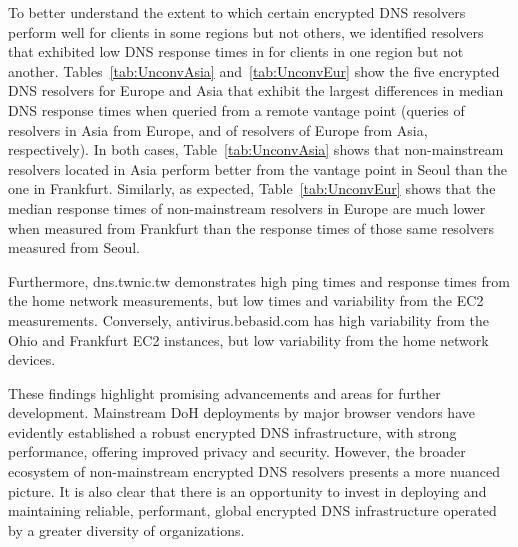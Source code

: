 To better understand the extent to which certain encrypted DNS resolvers
perform well for clients in some regions but not others, we identified
resolvers that exhibited low DNS response times in for clients in one region
but not another. 
Tables~\ref{tab:UnconvAsia} and~\ref{tab:UnconvEur} show 
the five encrypted DNS resolvers for Europe and Asia that exhibit the 
largest differences in median DNS response times when
queried from a remote vantage point (queries of resolvers in Asia from Europe,
and of resolvers of Europe from Asia, respectively). In both cases, 
Table~\ref{tab:UnconvAsia} shows that non-mainstream resolvers located
in Asia perform better from the vantage point in Seoul than the one in
Frankfurt.  Similarly, as expected, Table~\ref{tab:UnconvEur} shows that the
median response times of non-mainstream resolvers in Europe are much lower when
measured from Frankfurt than the response times of those same resolvers
measured from Seoul.


Furthermore, dns.twnic.tw demonstrates high ping times and response times from the home network measurements, but low times and variability from the EC2 measurements. Conversely, antivirus.bebasid.com has high variability from the Ohio and Frankfurt EC2 instances, but low variability from the home network devices. 


These findings highlight promising advancements and areas for further development. Mainstream DoH deployments by major browser vendors have evidently established a robust encrypted DNS infrastructure, with strong performance, offering improved privacy and security. However, the broader ecosystem of non-mainstream encrypted DNS resolvers presents a more nuanced picture. 
It is also clear that there is an opportunity
to invest in deploying and maintaining reliable, performant, global encrypted
DNS infrastructure operated by a greater diversity of organizations.
